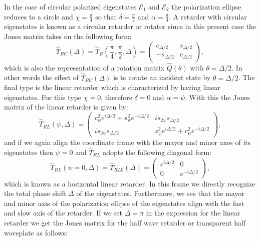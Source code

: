 In the case of circular polarized eigenstates $\bm{\mathcal{E}}_1$ and $\bm{\mathcal{E}}_2$ the polarization ellipse reduces to a circle and $\chi=\frac{\pi}{4}$ so that $\delta=\frac{\pi}{2}$ and $\alpha=\frac{\pi}{4}$. A retarder with circular eigenstates is known as a circular retarder or rotator since in this present case the Jones matrix takes on the following form:
\begin{equation}
    \hat{T}_{RC}(\Delta)=\hat{T}_R\left(\frac{\pi}{4}, \frac{\pi}{2}, \Delta\right) = 
    \begin{pmatrix} 
    c_{\Delta/2} & s_{\Delta/2} \\
    -s_{\Delta/2} & c_{\Delta/2}
    \end{pmatrix},
\end{equation}
which is also the representation of a rotation matrix $\hat{Q}(\theta)$ with $\theta=\Delta/2$. In other words the effect of $\hat{T}_{RC}(\Delta)$ is to rotate an incident state by $\theta=\Delta/2$. The final type is the linear retarder which is characterized by having linear eigenstates. For this type $\chi=0$, therefore $\delta=0$ and $\alpha=\psi$. With this the Jones matrix of the linear retarder is given by:
\begin{equation}
    \hat{T}_{RL}\left(\psi, \Delta\right) = 
    \begin{pmatrix} 
    c^2_{\psi} e^{i\Delta /2} + s^2_{\psi} e^{-i\Delta /2} & is_{2\psi} s_{\Delta/2} \\
    is_{2\psi} s_{\Delta/2} & s^2_{\psi} e^{i\Delta /2} + c^2_{\psi} e^{-i\Delta /2}
    \end{pmatrix},
\end{equation}
and if we again align the coordinate frame with the mayor and minor axes of its eigenstates then $\psi=0$ and $\hat{T}_{RL}$ adopts the following diagonal form:
\begin{equation}
    \hat{T}_{RL}\left(\psi=0, \Delta\right) = \hat{T}_{RL0}\left(\Delta\right) = 
    \begin{pmatrix} 
    e^{i\Delta /2} & 0 \\
    0 & e^{-i\Delta /2}
    \end{pmatrix},
\end{equation}
which is known as a horizontal linear retarder. In this frame we directly recognize the total phase shift $\Delta$ of the eigenstates. Furthermore, we see that the mayor and minor axis of the polarization ellipse of the eigenstates align with the fast and slow axis of the retarder. If we set $\Delta=\pi$ in the expression for the linear retarder we get the Jones matrix for the half wave retarder or transparent half waveplate as follows:
